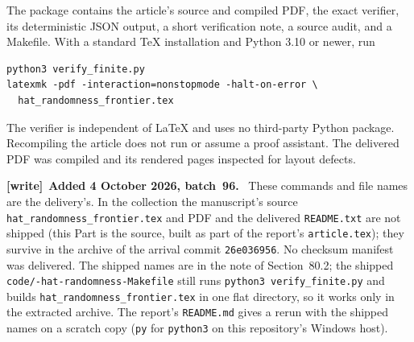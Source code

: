 \documentclass[11pt,letterpaper]{article}
\theoremstyle{definition}
\newenvironment{writenote}[1][]{\par\smallskip\begingroup\small
 \noindent\textbf{[write]}\if\relax\detokenize{#1}\relax\else~\textbf{#1.}\fi\ }%
 {\par\endgroup\smallskip}
\begin{document}
The package contains the article's source and compiled PDF, the exact
verifier, its deterministic JSON output, a short verification note,
a source audit, and a Makefile. With a standard TeX installation and
Python 3.10 or newer, run
\begin{verbatim}
python3 verify_finite.py
latexmk -pdf -interaction=nonstopmode -halt-on-error \
  hat_randomness_frontier.tex
\end{verbatim}
The verifier is independent of LaTeX and uses no third-party Python
package. Recompiling the article does not run or assume a proof
assistant. The delivered PDF was compiled and its rendered pages
inspected for layout defects.

\begin{writenote}[Added 4 October 2026, batch~96]
These commands and file names are the delivery's. In the collection the manuscript's source \texttt{hat\_\allowbreak randomness\_\allowbreak frontier.tex} and PDF and the delivered \texttt{README.txt} are not shipped (this Part is the source, built as part of the report's \texttt{article.tex}); they survive in the archive of the arrival commit \texttt{26e036956}. No checksum manifest was delivered. The shipped names are in the note of Section~80.2; the shipped \texttt{code/-hat-randomness-\allowbreak Makefile} still runs \texttt{python3 verify\_finite.py} and builds \texttt{hat\_\allowbreak randomness\_\allowbreak frontier.tex} in one flat directory, so it works only in the extracted archive. The report's \texttt{README.md} gives a rerun with the shipped names on a scratch copy (\texttt{py} for \texttt{python3} on this repository's Windows host).
\end{writenote}
\end{document}
